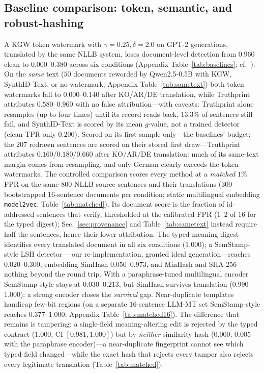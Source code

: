 \documentclass[journal]{IEEEtran}
\begin{document}
\subsection{Baseline comparison: token, semantic, and robust-hashing}
\label{sec:baselines}\label{sec:matched}
A KGW token watermark with $\gamma{=}0.25,\delta{=}2.0$ \cite{kirchenbauer2023kgw} on GPT-2 generations, translated by the same NLLB system, loses document-level detection from $0.960$ clean to $0.000$--$0.380$ across six conditions (Appendix Table~\ref{tab:baselines}; cf.\ \cite{he2024crosslingual}). On the \emph{same} text ($50$ documents reworded by Qwen2.5-0.5B with KGW, SynthID-Text, or no watermark; Appendix Table~\ref{tab:sametext}) both token watermarks fall to $0.000$--$0.140$ after KO/AR/DE translation, while Truthprint attributes $0.580$--$0.960$ with no false attribution---with caveats: Truthprint alone resamples (up to four times) until its record reads back, $13.3\%$ of sentences still fail, and SynthID-Text is scored by its mean $g$-value, not a trained detector (clean TPR only $0.200$). Scored on its first sample only---the baselines' budget; the $207$ redrawn sentences are scored on their stored first draw---Truthprint attributes $0.160$/$0.180$/$0.660$ after KO/AR/DE translation: much of its same-text margin comes from resampling, and only German clearly exceeds the token watermarks. The controlled comparison scores every method at a \emph{matched} $1\%$ FPR on the same $800$ NLLB source sentences and their translations ($300$ bootstrapped $16$-sentence documents per condition; static multilingual embedding \texttt{model2vec}; Table~\ref{tab:matched}). Its document score is the fraction of id-addressed sentences that verify, thresholded at the calibrated FPR ($1$--$2$ of $16$ for the typed digest); Sec.~\ref{sec:provenance} and Table~\ref{tab:sametext} instead require half the sentences, hence their lower attribution. The typed meaning-digest identifies every translated document in all six conditions ($1.000$); a SemStamp-style LSH detector \cite{hou2024semstamp}---our re-implementation, granted ideal generation---reaches $0.020$--$0.300$, embedding SimHash \cite{charikar2002simhash} $0.050$--$0.973$, and MinHash \cite{broder1997minhash} and SHA-256 nothing beyond the round trip. With a paraphrase-tuned multilingual encoder \cite{reimers2020multilingual} SemStamp-style stays at $0.030$--$0.213$, but SimHash survives translation ($0.990$--$1.000$): a strong encoder closes the \emph{survival} gap. Near-duplicate templates handicap few-bit regions (on a separate $16$-sentence LLM-MT set SemStamp-style reaches $0.377$--$1.000$; Appendix Table~\ref{tab:matched16}). The difference that remains is tampering: a single-field meaning-altering edit is rejected by the typed contract ($1.000$, CI $[0.981,1.000]$) but by \emph{neither} similarity hash ($0.000$; $0.005$ with the paraphrase encoder)---a near-duplicate fingerprint cannot see which typed field changed---while the exact hash that rejects every tamper also rejects every legitimate translation (Table~\ref{tab:matched}).
\end{document}
